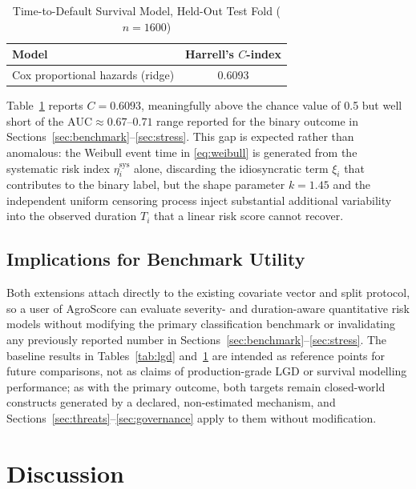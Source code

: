 \documentclass[journal]{IEEEtran}
\newcommand{\auc}{\mbox{AUC}}
\begin{document}
\begin{table}[!t]
\caption{Time-to-Default Survival Model, Held-Out Test Fold ($n=1600$)}
\label{tab:survival}
\centering
\footnotesize
\begin{tabular}{@{}lc@{}}
\toprule
Model & Harrell's $C$-index \\
\midrule
Cox proportional hazards (ridge) & 0.6093 \\
\bottomrule
\end{tabular}
\end{table}

Table~\ref{tab:survival} reports $C=0.6093$, meaningfully above the chance value of 0.5 \cite{cox1972regression,harrell1982cindex} but well short of the $\auc\approx0.67$--$0.71$ range reported for the binary outcome in Sections~\ref{sec:benchmark}--\ref{sec:stress}. This gap is expected rather than anomalous: the Weibull event time in \eqref{eq:weibull} is generated from the systematic risk index $\eta_i^{\text{sys}}$ alone, discarding the idiosyncratic term $\xi_i$ that contributes to the binary label, but the shape parameter $k=1.45$ and the independent uniform censoring process inject substantial additional variability into the observed duration $T_i$ that a linear risk score cannot recover.

\subsection{Implications for Benchmark Utility}
Both extensions attach directly to the existing covariate vector and split protocol, so a user of AgroScore can evaluate severity- and duration-aware quantitative risk models without modifying the primary classification benchmark or invalidating any previously reported number in Sections~\ref{sec:benchmark}--\ref{sec:stress}. The baseline results in Tables~\ref{tab:lgd} and~\ref{tab:survival} are intended as reference points for future comparisons, not as claims of production-grade LGD or survival modelling performance; as with the primary outcome, both targets remain closed-world constructs generated by a declared, non-estimated mechanism, and Sections~\ref{sec:threats}--\ref{sec:governance} apply to them without modification.

\section{Discussion}
\end{document}
